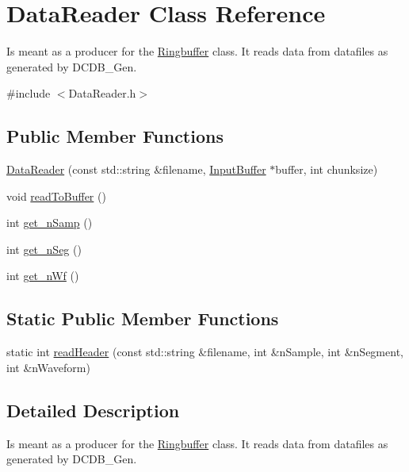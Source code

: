 \hypertarget{classDataReader}{\section{Data\-Reader Class Reference}
\label{classDataReader}
}


Is meant as a producer for the \hyperlink{classRingbuffer}{Ringbuffer} class. It reads data from datafiles as generated by D\-C\-D\-B\-\_\-\-Gen.  




{\ttfamily \#include $<$Data\-Reader.\-h$>$}

\subsection*{Public Member Functions}
\begin{DoxyCompactItemize}
\item 
\hyperlink{classDataReader_a11f1b8c98c7cd0f0998b6df84a0e1ea8}{Data\-Reader} (const std\-::string \&filename, \hyperlink{classRingbuffer}{Input\-Buffer} $\ast$buffer, int chunksize)
\item 
void \hyperlink{classDataReader_aefb5de1f5a148eaef4b317dc93cf61d5}{read\-To\-Buffer} ()
\item 
int \hyperlink{classDataReader_a8ada95ad5aca5fbb3e50f0b6a954a623}{get\-\_\-n\-Samp} ()
\item 
int \hyperlink{classDataReader_a94f681f6c77c9ad57c09b26fc367084b}{get\-\_\-n\-Seg} ()
\item 
int \hyperlink{classDataReader_ad754d5ff3d2e833aaabf9460f47a77e4}{get\-\_\-n\-Wf} ()
\end{DoxyCompactItemize}
\subsection*{Static Public Member Functions}
\begin{DoxyCompactItemize}
\item 
static int \hyperlink{classDataReader_a92348a971a3d82d9b5a785f254c1b290}{read\-Header} (const std\-::string \&filename, int \&n\-Sample, int \&n\-Segment, int \&n\-Waveform)
\end{DoxyCompactItemize}


\subsection{Detailed Description}
Is meant as a producer for the \hyperlink{classRingbuffer}{Ringbuffer} class. It reads data from datafiles as generated by D\-C\-D\-B\-\_\-\-Gen. 

